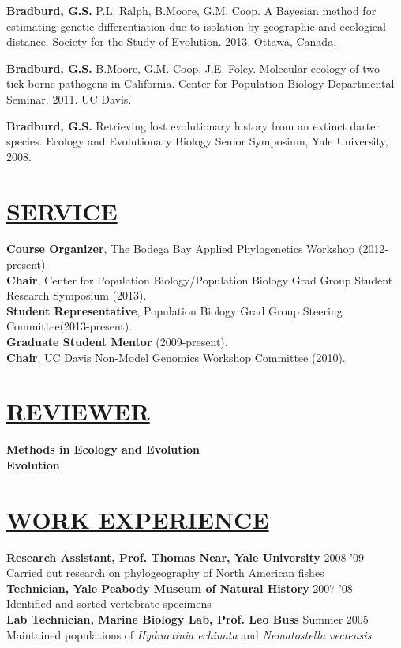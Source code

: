 \documentclass{res}
\begin{document}
\begin{resume}
\textbf{Bradburd, G.S.}  P.L. Ralph, B.Moore, G.M. Coop. A Bayesian method for estimating genetic differentiation due to isolation by geographic and ecological distance.  Society for the Study of Evolution. 2013. Ottawa, Canada.\

\textbf{Bradburd, G.S.}  B.Moore, G.M. Coop, J.E. Foley. Molecular ecology of two tick-borne pathogens in California.  Center for Population Biology Departmental Seminar. 2011. UC Davis.\

\textbf{Bradburd, G.S.}  Retrieving lost evolutionary history from an extinct darter species.  Ecology and Evolutionary Biology Senior Symposium, Yale University, 2008.

\section{\underline{SERVICE}}
\textbf{Course Organizer}, The Bodega Bay Applied Phylogenetics Workshop (2012-present).\\
%
\textbf{Chair}, Center for Population Biology/Population Biology Grad Group Student Research Symposium (2013).\\
%
\textbf{Student Representative}, Population Biology Grad Group Steering Committee(2013-present).\\
%
\textbf{Graduate Student Mentor} (2009-present). \\
%
\textbf{Chair}, UC Davis Non-Model Genomics Workshop Committee (2010).
%
\section{\underline{REVIEWER}}
\textbf{Methods in Ecology and Evolution}\\
\textbf{Evolution}


\section{\underline{WORK EXPERIENCE}}
\textbf{Research Assistant, Prof. Thomas Near, Yale University} 2008-'09 \\ \vspace{0.3mm}	%
\hspace{4.5mm}Carried out research on phylogeography of North American fishes\\
\textbf{Technician, Yale Peabody Museum of Natural History} 2007-'08 \\ \vspace{0.3mm}	%
\hspace{4.5mm}Identified and sorted vertebrate specimens\\ 
\textbf{Lab Technician, Marine Biology Lab, Prof. Leo Buss} Summer 2005 \\ \vspace{0.3mm}	%
\hspace{4.5mm}Maintained populations of \textit{Hydractinia echinata} and \textit{Nematostella vectensis} 


\end{resume}
\end{document}
